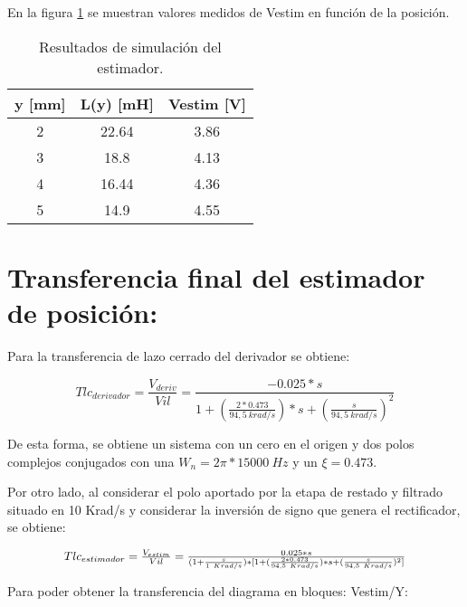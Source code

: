 \noindent En la figura \ref{tab_Resultados_de_simulación_del_estimador} se muestran valores medidos de Vestim en funci\'{o}n de la posici\'{o}n.

\begin{table}[H]
	\begin{center}
		\begin{tabular}{| c | c | c |}
			\hline
		y [mm] & L(y) [mH] & Vestim [V] \\ \hline 
		2 & 22.64 & 3.86 \\ \hline 
		3 & 18.8 & 4.13 \\ \hline 
		4 & 16.44 & 4.36 \\ \hline 
		5 & 14.9 & 4.55 \\ \hline 
		\end{tabular}
		\caption{Resultados de simulación del estimador.}
		\label{tab_Resultados_de_simulación_del_estimador}
	\end{center}
\end{table}

\section{Transferencia final del estimador de posici\'{o}n:}

\noindent Para la transferencia de lazo cerrado del derivador se obtiene:

\begin{equation} \label{eq_TLC_deriv_1}
	{Tlc}_{derivador}=\frac{V_{deriv}}{Vil}=\frac{-0.025*s}{1+(\frac{2*0.473}{94,5\ krad/s})*s+(\frac{s}{94,5\ krad/s})^2}
\end{equation}

\noindent De esta forma, se obtiene un sistema con un cero en el origen y dos polos complejos conjugados con una $W_n=2\pi *15000\ Hz$ y un $\xi =0.473$.

\noindent Por otro lado, al considerar el polo aportado por la etapa de restado y filtrado situado en 10 Krad/s y considerar la inversi\'{o}n de signo que genera el rectificador, se obtiene:

\begin{equation} \label{eq_TLC_deriv_2}
	\resizebox{.8\hsize}{!}
	{
	$
	{Tlc}_{estimador}=\frac{V_{estim}}{Vil}=\frac{0.025*s}{(1+\frac{s}{1\ Krad/s})*[1+(\frac{2*0.473}{94,5\ Krad/s})*s+(\frac{s}{94,5\ Krad/s})^2]}
	$
	}
\end{equation}

\noindent Para poder obtener la transferencia del diagrama en bloques: Vestim/Y:

